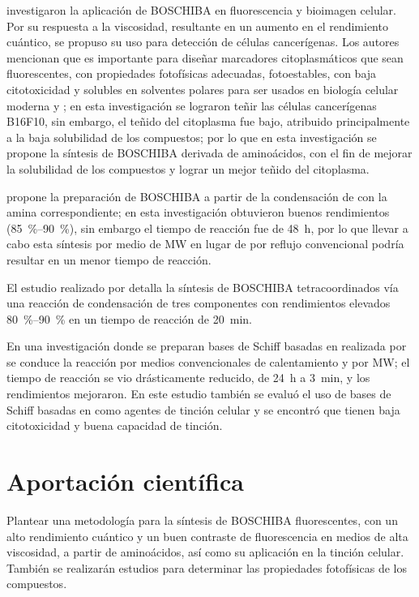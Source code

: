 \documentclass[spanish,mexico,12pt]{scrartcl}
\begin{document}
\textcite{ibarra-rodriguezOrganoboronSchiffBases2019} investigaron la aplicación de \gls{BOSCHIBA} en fluorescencia y bioimagen celular. Por su respuesta a la viscosidad, resultante en un aumento en el rendimiento cuántico, se propuso su uso para detección de células cancerígenas. Los autores mencionan que es importante para diseñar marcadores citoplasmáticos que sean fluorescentes, con propiedades fotofísicas adecuadas, fotoestables, con baja citotoxicidad y solubles en solventes polares para ser usados en biología celular moderna \invitro{} y \invivo{}; en esta investigación se lograron teñir las células cancerígenas B16F10, sin embargo, el teñido del citoplasma fue bajo, atribuido principalmente a la baja solubilidad de los compuestos; por lo que en esta investigación se propone la síntesis de \gls{BOSCHIBA} derivada de aminoácidos, con el fin de mejorar la solubilidad de los compuestos y lograr un mejor teñido del citoplasma.

\textcite{corona-lopezFarRedInfrared2021} propone la preparación de \gls{BOSCHIBA} a partir de la condensación de  con la amina correspondiente; en esta investigación obtuvieron buenos rendimientos  (\qtyrange{85}{90}{\percent}), sin embargo el tiempo de reacción fue de \qty{48}{\hour}, por lo que llevar a cabo esta síntesis por medio de \gls{MW} en lugar de por reflujo convencional podría resultar en un menor tiempo de reacción.

El estudio realizado por \textcite{garcia-lopezNewLuminescentOrganoboron2022} detalla la síntesis de \gls{BOSCHIBA} tetracoordinados vía una reacción de condensación de tres componentes con rendimientos elevados \qtyrange{80}{90}{\percent} en un tiempo de reacción de \qty{20}{\minute}.

En una investigación donde se preparan bases de Schiff basadas en  realizada por \textcite{lopez-espejelOrganotinSchiffBases2021} se conduce la reacción por medios convencionales de calentamiento y por \gls{MW}; el tiempo de reacción se vio drásticamente reducido, de \qty{24}{\hour} a \qty{3}{\minute}, y los rendimientos mejoraron. En este estudio también se evaluó el uso de bases de Schiff basadas en  como agentes de tinción celular y se encontró que tienen baja citotoxicidad y buena capacidad de tinción.

\section{Aportación científica}
Plantear una metodología para la síntesis de \gls{BOSCHIBA} fluorescentes, con un alto rendimiento cuántico y un buen contraste de fluorescencia en medios de alta viscosidad, a partir de aminoácidos, así como su aplicación en la tinción celular. También se realizarán estudios \insilico{} para determinar las propiedades fotofísicas de los compuestos.
\end{document}

